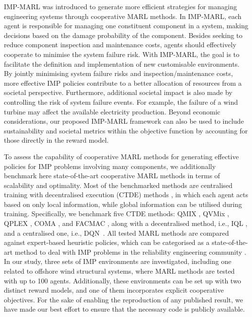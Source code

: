 IMP-MARL was introduced to generate more efficient strategies for managing engineering systems through cooperative MARL methods.
In IMP-MARL, each agent is responsible for managing one constituent component in a system, making decisions based on the damage probability of the component.
Besides seeking to reduce component inspection and maintenance costs, agents should effectively cooperate to minimise the system failure risk.
With IMP-MARL, the goal is to facilitate the definition and implementation of new customisable environments.
By jointly minimising system failure risks and inspection/maintenance costs, more effective IMP policies contribute to a better allocation of resources from a societal perspective.
Furthermore, additional societal impact is also made by controlling the risk of system failure events. 
For example, the failure of a wind turbine may affect the available electricity production. 
Beyond economic considerations, our proposed IMP-MARL framework can also be used to include sustainability and societal metrics within the objective function by accounting for those directly in the reward model.


To assess the capability of cooperative MARL methods for generating effective policies for IMP problems involving many components, we additionally benchmark here state-of-the-art cooperative MARL methods in terms of scalability and optimality. 
Most of the benchmarked methods are centralised training with decentralised execution (CTDE) methods \citep{Oliehoek_2008,KRAEMER201682}, in which each agent acts based on only local information, while global information can be utilised during training.
Specifically, we benchmark five CTDE methods: QMIX \citep{Rashid2018}, QVMix \citep{leroy2020qvmix}, QPLEX \citep{wang2021qplex}, COMA \citep{Foerster2017}, and FACMAC \citep{peng2021facmac}, along with a decentralised method, i.e., IQL \citep{Tan1993}, and a centralised one, i.e., DQN~\citep{Mnih2015}.
All tested MARL methods are compared against expert-based heuristic policies, which can be categorised as a state-of-the-art method to deal with IMP problems in the reliability engineering community \citep{LuqueDBN2019, morato2022optimal}.
In our study, three sets of IMP environments are investigated, including one related to offshore wind structural systems, where MARL methods are tested with up to 100 agents.
Additionally, these environments can be set up with two distinct reward models, and one of them incorporates explicit cooperative objectives.
For the sake of enabling the reproduction of any published result, we have made our best effort to ensure that the necessary code is publicly available.

